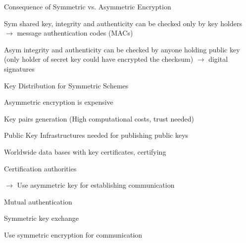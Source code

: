 \documentclass[a4paper]{article}
\begin{document}
\begin{multicols}{3}
    Consequence of Symmetric vs. Asymmetric Encryption
    \begin{itemize*}
        \item[Sym] shared key, integrity and authenticity can be checked only by key holders $\rightarrow$ message authentication codes (MACs)
        \item[Asym] integrity and authenticity can be checked by anyone holding public key (only holder of secret key could have encrypted the checksum) $\rightarrow$ digital signatures
    \end{itemize*}

    Key Distribution for Symmetric Schemes
    \begin{itemize*}
        \item Asymmetric encryption is expensive
        \item Key pairs generation (High computational costs, trust needed)
        \item Public Key Infrastructures needed for publishing public keys
        \begin{itemize*}
            \item Worldwide data bases with key certificates, certifying
            \item Certification authorities
        \end{itemize*}
        \item[$\rightarrow$] Use asymmetric key for establishing communication
        \begin{itemize*}
            \item Mutual authentication
            \item Symmetric key exchange
        \end{itemize*}
        \item Use symmetric encryption for communication
    \end{itemize*}


\end{multicols}
\end{document}
